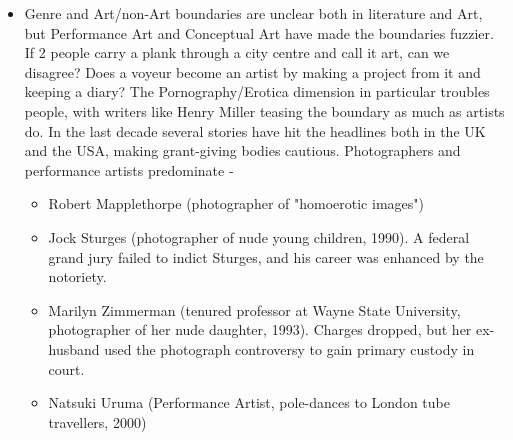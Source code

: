 \documentclass[11pt]{article}
\begin{document}
\begin{itemize}
\begin{itemize}
\item  Genre and Art/non-Art boundaries are unclear both in literature and Art,
  but Performance Art and Conceptual Art have made the boundaries fuzzier. If
  2 people carry a plank through a city centre and call it art, can we
disagree?
  Does a voyeur become an artist by making a project from it and keeping a
  diary? The Pornography/Erotica dimension in particular troubles people, with writers
  like Henry Miller teasing the boundary as much as artists do. In the last
decade several stories have hit the headlines both in the UK and
the USA, making grant-giving bodies cautious. Photographers and performance
artists predominate -
\begin{itemize}
\item Robert Mapplethorpe (photographer of "homoerotic images")
\item Jock Sturges (photographer of nude young children, 1990).  A federal
grand jury failed to indict Sturges, and his career was enhanced by
the notoriety.
\item Marilyn Zimmerman  (tenured professor at Wayne State University, 
photographer of her nude daughter, 1993). Charges dropped, but her ex-husband
used the photograph controversy to gain primary custody in court.
\item Natsuki Uruma (Performance Artist, pole-dances to London tube travellers, 2000)
\end{itemize}


\end{itemize}
\end{itemize}
\end{document}
